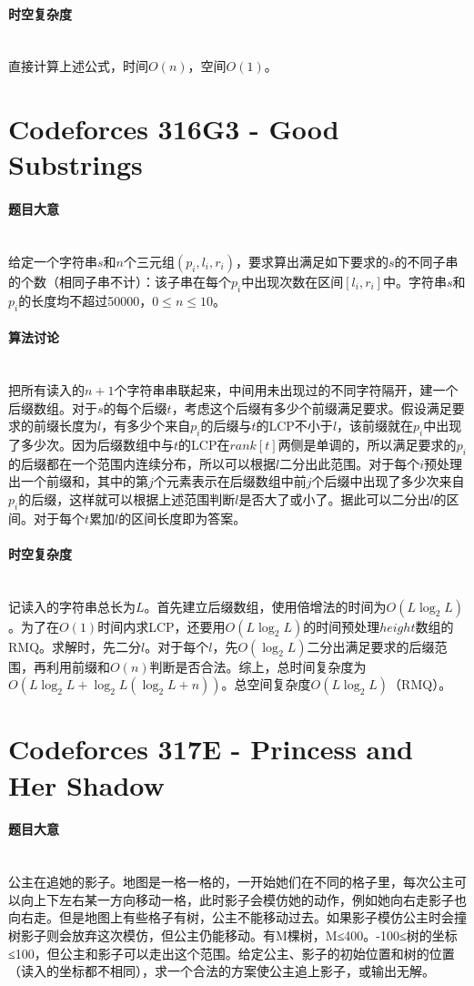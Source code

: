\documentclass[UTF8]{ctexart}
\newcommand{\myparagraph}[1]{\paragraph{#1}\mbox{}\\}
\theoremstyle{nonumberplain}
\begin{document}
		\myparagraph{时空复杂度}
		
			直接计算上述公式，时间$O(n)$，空间$O(1)$。
	
	\section{Codeforces 316G3 - Good Substrings}
		
		\myparagraph{题目大意}
		
			给定一个字符串$s$和$n$个三元组$(p_i,l_i,r_i)$，要求算出满足如下要求的$s$的不同子串的个数（相同子串不计）：该子串在每个$p_i$中出现次数在区间$[l_i,r_i]$中。字符串$s$和$p_i$的长度均不超过50000，$0 \leq n \leq 10$。
		
		\myparagraph{算法讨论}
		
			把所有读入的$n+1$个字符串串联起来，中间用未出现过的不同字符隔开，建一个后缀数组。对于$s$的每个后缀$t$，考虑这个后缀有多少个前缀满足要求。假设满足要求的前缀长度为$l$，有多少个来自$p_i$的后缀与$t$的LCP不小于$l$，该前缀就在$p_i$中出现了多少次。因为后缀数组中与$t$的LCP在$rank[t]$两侧是单调的，所以满足要求的$p_i$的后缀都在一个范围内连续分布，所以可以根据$l$二分出此范围。对于每个$i$预处理出一个前缀和，其中的第$j$个元素表示在后缀数组中前$j$个后缀中出现了多少次来自$p_i$的后缀，这样就可以根据上述范围判断$l$是否大了或小了。据此可以二分出$l$的区间。对于每个$t$累加$l$的区间长度即为答案。
		
		\myparagraph{时空复杂度}
		
			记读入的字符串总长为$L$。首先建立后缀数组，使用倍增法的时间为$O(L\log_2L)$。为了在$O(1)$时间内求LCP，还要用$O(L\log_2L)$的时间预处理$height$数组的RMQ。求解时，先二分$l$。对于每个$l$，先$O(\log_2L)$二分出满足要求的后缀范围，再利用前缀和$O(n)$判断是否合法。综上，总时间复杂度为$O(L\log_2L+\log_2L(\log_2L+n))$。总空间复杂度$O(L\log_2L)$（RMQ）。
	
	\section{Codeforces 317E - Princess and Her Shadow}
	
		\myparagraph{题目大意}
		
			公主在追她的影子。地图是一格一格的，一开始她们在不同的格子里，每次公主可以向上下左右某一方向移动一格，此时影子会模仿她的动作，例如她向右走影子也向右走。但是地图上有些格子有树，公主不能移动过去。如果影子模仿公主时会撞树影子则会放弃这次模仿，但公主仍能移动。有M棵树，M≤400。-100≤树的坐标≤100，但公主和影子可以走出这个范围。给定公主、影子的初始位置和树的位置（读入的坐标都不相同），求一个合法的方案使公主追上影子，或输出无解。
		
\end{document}
